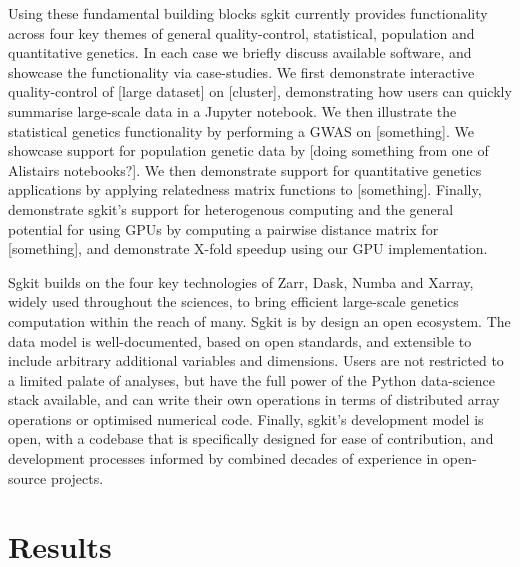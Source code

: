 \documentclass[a4paper,num-refs]{oup-contemporary}
\begin{document}
Using these fundamental building blocks sgkit currently provides
functionality across four key themes of general quality-control,
statistical, population and quantitative genetics. In
each case we briefly discuss available software, and showcase
the functionality via case-studies.
We first demonstrate interactive quality-control of [large dataset]
on [cluster], demonstrating how users can quickly summarise
large-scale data in a Jupyter notebook. We then illustrate the
statistical genetics functionality by performing a GWAS
on [something]. We showcase support for
population genetic data by [doing something from one of Alistairs
notebooks?].
We then demonstrate support for quantitative genetics
applications by applying relatedness matrix functions to [something].
Finally, demonstrate sgkit's support for heterogenous computing
and the general potential for using GPUs by computing a
pairwise distance matrix for [something], and demonstrate
X-fold speedup using our GPU implementation.

Sgkit builds on the four key technologies of Zarr, Dask, Numba and Xarray,
widely used throughout the sciences, to bring efficient large-scale
genetics computation within the reach of many.
Sgkit is by design an open ecosystem.
The data model is well-documented,
based on open standards, and extensible to include arbitrary additional
variables and dimensions. Users are not restricted to a limited palate
of analyses, but have the full power of the Python data-science stack
available, and can write their own operations in terms of distributed
array operations or optimised numerical code. Finally, sgkit's
development model is open, with a codebase that is specifically
designed for ease of contribution,
and development processes informed
by combined decades of experience in open-source projects.

\section{Results}
\end{document}
